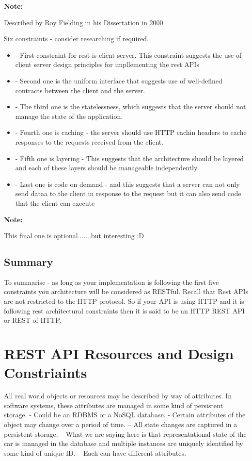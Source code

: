 \documentclass[a4paper, 11pt]{book}
\newenvironment{note}{
    \begin{siderule}
        \textbf{Note: }
        }{
    \end{siderule}
}
\begin{document}
    \begin{note}
        Described by Roy Fielding in his Dissertation in 2000.
    \end{note}


    Six constraints - consider researching if required.
    \begin{itemize}
        \item - First constraint for rest is client server. This constraint suggests the use of client server design principles for impllementing the rest APIs
        \item - Second one is the uniform interface that suggests use of well-defined contracts between the client and the server.
        \item - The third one is the statelessness, which suggests that the server should not manage the state of the application.
        \item - Fourth one is caching - the server should use HTTP cachin headers to cache responses to the requests received from the client.
        \item - Fifth one is layering - This suggests that the architecture should be layered and each of these layers should be manageable independently
        \item - Last one is code on demand - and this suggests that a server can not only send dataa to the client in response to the request but it can also send code that the client can execute
    \end{itemize}

    \begin{note}
        This final one is optional.......but interesting :D
    \end{note}

    \subsection{Summary}
    To summarise - as long as your implementation is following the first five constraints you architecture will be considered as RESTful.
    Recall that Rest APIs are not restricted to the HTTP protocol.
    So if your API is using HTTP and it is following rest architectural constraints then it is said to be an HTTP REST API or REST of HTTP.


    \section{REST API Resources and Design Constriaints}
    All real world objects or resources may be described by way of attributes.
    In software systems, these attributes are managed in some kind of persistent storage.
    - Could be an RDBMS or a NoSQL database.
    - Certain attributes of the object may change over a period of time.
    -- All state changes are captured in a persistent storage.
    -- What we are saying here is that representational state of the car is managed in the database and multiple instances are uniquely identified by some kind of unique ID.
    -- Each can have different attributes.
\end{document}
